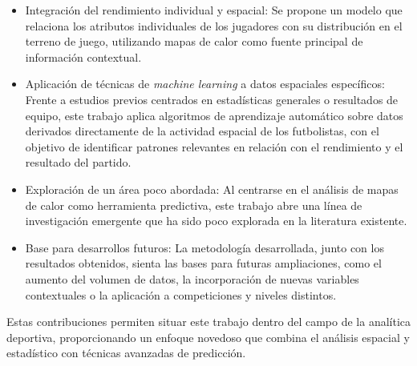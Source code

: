 \begin{itemize}
    \item Integración del rendimiento individual y espacial: Se propone un modelo que relaciona los atributos individuales de los jugadores con su distribución en el terreno de juego, utilizando mapas de calor como fuente principal de información contextual.
    \item Aplicación de técnicas de \textit{machine learning} a datos espaciales específicos: Frente a estudios previos centrados en estadísticas generales o resultados de equipo, este trabajo aplica algoritmos de aprendizaje automático sobre datos derivados directamente de la actividad espacial de los futbolistas, con el objetivo de identificar patrones relevantes en relación con el rendimiento y el resultado del partido.
    \item Exploración de un área poco abordada: Al centrarse en el análisis de mapas de calor como herramienta predictiva, este trabajo abre una línea de investigación emergente que ha sido poco explorada en la literatura existente.
    \item Base para desarrollos futuros: La metodología desarrollada, junto con los resultados obtenidos, sienta las bases para futuras ampliaciones, como el aumento del volumen de datos, la incorporación de nuevas variables contextuales o la aplicación a competiciones y niveles distintos.
\end{itemize}

Estas contribuciones permiten situar este trabajo dentro del campo de la analítica deportiva, proporcionando un enfoque novedoso que combina el análisis espacial y estadístico con técnicas avanzadas de predicción.
